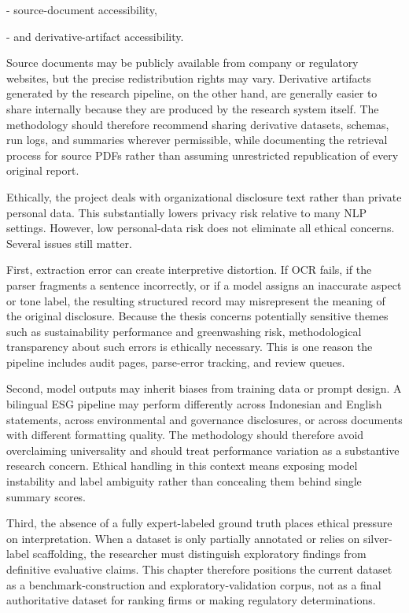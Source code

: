 \documentclass{article}
\begin{document}
- source-document accessibility,

- and derivative-artifact accessibility.

Source documents may be publicly available from company or regulatory websites, but the precise redistribution rights may vary. Derivative artifacts generated by the research pipeline, on the other hand, are generally easier to share internally because they are produced by the research system itself. The methodology should therefore recommend sharing derivative datasets, schemas, run logs, and summaries wherever permissible, while documenting the retrieval process for source PDFs rather than assuming unrestricted republication of every original report.

Ethically, the project deals with organizational disclosure text rather than private personal data. This substantially lowers privacy risk relative to many NLP settings. However, low personal-data risk does not eliminate all ethical concerns. Several issues still matter.

First, extraction error can create interpretive distortion. If OCR fails, if the parser fragments a sentence incorrectly, or if a model assigns an inaccurate aspect or tone label, the resulting structured record may misrepresent the meaning of the original disclosure. Because the thesis concerns potentially sensitive themes such as sustainability performance and greenwashing risk, methodological transparency about such errors is ethically necessary. This is one reason the pipeline includes audit pages, parse-error tracking, and review queues.

Second, model outputs may inherit biases from training data or prompt design. A bilingual ESG pipeline may perform differently across Indonesian and English statements, across environmental and governance disclosures, or across documents with different formatting quality. The methodology should therefore avoid overclaiming universality and should treat performance variation as a substantive research concern. Ethical handling in this context means exposing model instability and label ambiguity rather than concealing them behind single summary scores.

Third, the absence of a fully expert-labeled ground truth places ethical pressure on interpretation. When a dataset is only partially annotated or relies on silver-label scaffolding, the researcher must distinguish exploratory findings from definitive evaluative claims. This chapter therefore positions the current dataset as a benchmark-construction and exploratory-validation corpus, not as a final authoritative dataset for ranking firms or making regulatory determinations.
\end{document}
